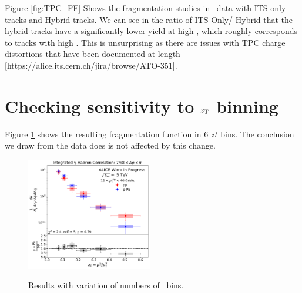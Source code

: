 Figure \ref{fig:TPC_FF} Shows the fragmentation studies in \pPb~data with ITS only tracks and Hybrid tracks. We can see in the ratio of ITS Only/ Hybrid that the hybrid tracks have a significantly lower yield at high \zt, which roughly corresponds to tracks with high \pt. This is unsurprising as there are issues with TPC charge distortions that have been documented at length [https://alice.its.cern.ch/jira/browse/ATO-351].
\section{Checking sensitivity to $z_{\mathrm{T}}$ binning}
Figure \ref{fig:FF_zT_Rebin} shows the resulting fragmentation function in 6 $zt$ bins. The conclusion we draw from the data does is not affected by this change.


\begin{figure}
\centering
\includegraphics[width=0.49\textwidth]{G-H_New/zT_Rebin_6_006zT06zTITSSub/Final_FFunction_and_Ratio.pdf}
\label{fig:FF_zT_Rebin}
\caption{Results with variation of numbers of \zt~bins. }
\end{figure}





